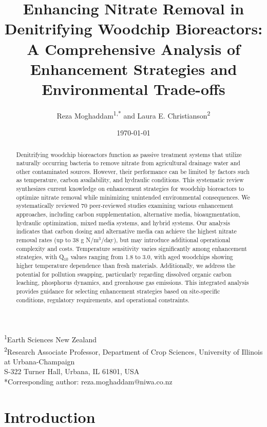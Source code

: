 \documentclass[12pt,a4paper]{article}
\title{Enhancing Nitrate Removal in Denitrifying Woodchip Bioreactors: A Comprehensive Analysis of Enhancement Strategies and Environmental Trade-offs}
\author{Reza Moghaddam\textsuperscript{1,*} and Laura E. Christianson\textsuperscript{2}}
\date{\today}
\begin{document}
\maketitle

\begin{center}
\footnotesize
\textsuperscript{1}Earth Sciences New Zealand\\
\textsuperscript{2}Research Associate Professor, Department of Crop Sciences, University of Illinois at Urbana-Champaign\\
S-322 Turner Hall, Urbana, IL 61801, USA\\
*Corresponding author: reza.moghaddam@niwa.co.nz
\end{center}

\begin{abstract}
Denitrifying woodchip bioreactors function as passive treatment systems that utilize naturally occurring bacteria to remove nitrate from agricultural drainage water and other contaminated sources. However, their performance can be limited by factors such as temperature, carbon availability, and hydraulic conditions. This systematic review synthesizes current knowledge on enhancement strategies for woodchip bioreactors to optimize nitrate removal while minimizing unintended environmental consequences. We systematically reviewed 70 peer-reviewed studies examining various enhancement approaches, including carbon supplementation, alternative media, bioaugmentation, hydraulic optimization, mixed media systems, and hybrid systems. Our analysis indicates that carbon dosing and alternative media can achieve the highest nitrate removal rates (up to 38 g N/m$^3$/day), but may introduce additional operational complexity and costs. Temperature sensitivity varies significantly among enhancement strategies, with Q$_{10}$ values ranging from 1.8 to 3.0, with aged woodchips showing higher temperature dependence than fresh materials. Additionally, we address the potential for pollution swapping, particularly regarding dissolved organic carbon leaching, phosphorus dynamics, and greenhouse gas emissions. This integrated analysis provides guidance for selecting enhancement strategies based on site-specific conditions, regulatory requirements, and operational constraints.
\end{abstract}

\section{Introduction}
\end{document}
